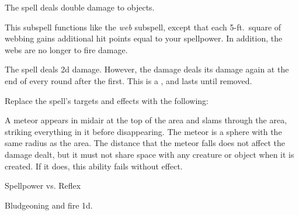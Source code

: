 The spell deals double damage to objects.






This subspell functions like the \textit{web} subspell, except that each 5-ft.\ square of webbing gains additional hit points equal to your spellpower.
In addition, the webs are no longer  to fire damage.







The spell deals \minus2d damage.
However, the damage deals its damage again at the end of every round after the first.
This is a , and lasts until removed.









Replace the spell's targets and effects with the following:
\begin{spellcontent}

\begin{augmenttargetinginfo}




\end{augmenttargetinginfo}


\begin{augmenteffects}



\spelleffect
A meteor appears in midair at the top of the area and slams through the area, striking everything in it before disappearing.
The meteor is a sphere with the same radius as the area.
The distance that the meteor falls does not affect the damage dealt, but it must not share space with any creature or object when it is created.
If it does, this ability fails without effect.




\begin{spellattack}{Spellpower vs. Reflex}


\spellsuccess Bludgeoning and fire  \minus1d.


\end{spellattack}





\end{augmenteffects}

\end{spellcontent}





